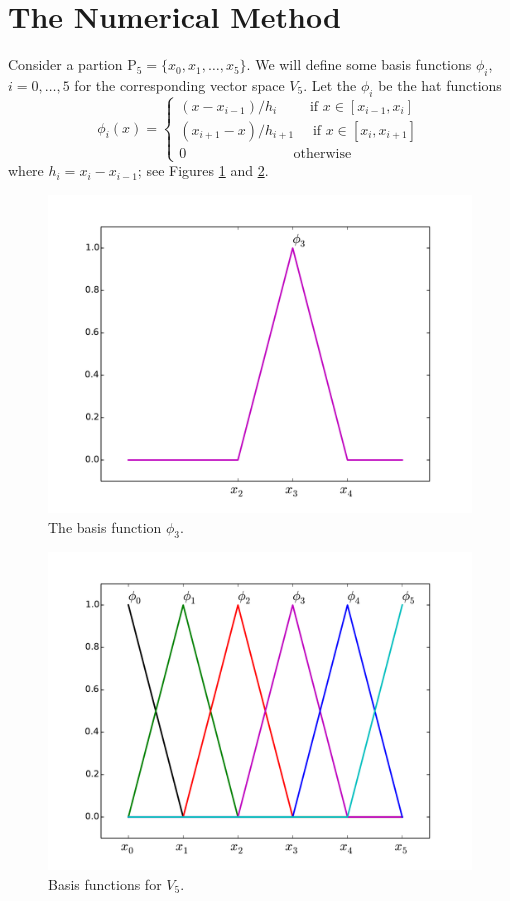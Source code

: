 \section*{The Numerical Method}
Consider a partion $\mathrm{P}_5 = \{x_0, x_1, \ldots, x_5\}$. We will define some basis functions $\phi_i$, $i = 0, \ldots, 5$ for the corresponding vector space $V_5$. Let the $\phi_i$ be the hat functions 
\[
\phi_i(x) = \begin{cases}
(x - x_{i-1})/h_i \quad \quad\text{ if } x \in [x_{i-1},x_i]\\
 (x_{i+1} - x)/h_{i+1} \quad \text{ if } x \in [x_{i},x_{i+1}]\\
0 \quad \quad \quad \quad \quad \quad \quad \,\,\text{ otherwise}
\end{cases}
\]
where $h_i = x_i - x_{i-1}$; see Figures \ref{FEM:one_basis_function} and \ref{FEM:basis_functions}. 


\begin{figure}[ht]
\centering
\includegraphics[width=\textwidth]{one_basis_function.pdf}
\caption{The basis function $\phi_3$.}
\label{FEM:one_basis_function}
\end{figure}


\begin{figure}[ht]
\centering
\includegraphics[width=\textwidth]{basis_functions.pdf}
\caption{Basis functions for $V_5$.}
\label{FEM:basis_functions}
\end{figure}

